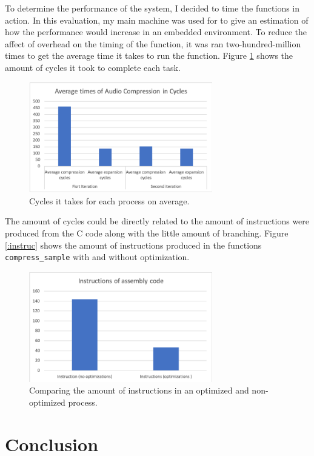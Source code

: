 \documentclass[12pt]{article}
\begin{document}
To determine the performance of the system, I decided to time the functions in action. In this evaluation, my main machine was used for to give an estimation of how the performance would increase in an embedded environment. To reduce the affect of overhead on the timing of the function, it was ran two-hundred-million times to get the average time it takes to run the function. Figure \ref{fig:cycle} shows the amount of cycles it took to complete each task.

 \begin{figure}[!h]
		\centering
        \includegraphics[width=8cm]
        {cycles.png}
        \caption{\label{fig:cycle} Cycles it takes for each process on average.}
\end{figure} 

The amount of cycles could be directly related to the amount of instructions were produced from the C code along with the little amount of branching. Figure \ref{:instruc} shows the amount of instructions produced in the functions \texttt{compress\_sample} with and without optimization. 

\begin{figure}[!h]
		\centering
        \includegraphics[width=8cm]
        {instrucs.png}
        \caption{\label{fig:instruc} Comparing the amount of instructions in an optimized and non-optimized process.}
\end{figure}

\section{Conclusion}
\end{document}
